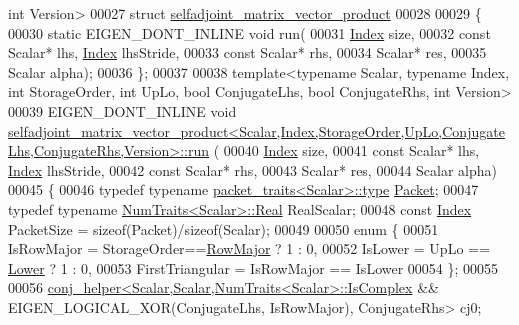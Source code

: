 \begin{DoxyCode}
       \textcolor{keywordtype}{int} Version>
00027 \textcolor{keyword}{struct }\hyperlink{struct_eigen_1_1internal_1_1selfadjoint__matrix__vector__product}{selfadjoint\_matrix\_vector\_product}
00028 
00029 \{
00030 \textcolor{keyword}{static} EIGEN\_DONT\_INLINE \textcolor{keywordtype}{void} run(
00031   \hyperlink{namespace_eigen_a62e77e0933482dafde8fe197d9a2cfde}{Index} size,
00032   \textcolor{keyword}{const} Scalar*  lhs, \hyperlink{namespace_eigen_a62e77e0933482dafde8fe197d9a2cfde}{Index} lhsStride,
00033   \textcolor{keyword}{const} Scalar*  rhs,
00034   Scalar* res,
00035   Scalar alpha);
00036 \};
00037 
00038 \textcolor{keyword}{template}<\textcolor{keyword}{typename} Scalar, \textcolor{keyword}{typename} Index, \textcolor{keywordtype}{int} StorageOrder, \textcolor{keywordtype}{int} UpLo, \textcolor{keywordtype}{bool} ConjugateLhs, \textcolor{keywordtype}{bool} ConjugateRhs,
       \textcolor{keywordtype}{int} Version>
00039 EIGEN\_DONT\_INLINE \textcolor{keywordtype}{void} 
      \hyperlink{struct_eigen_1_1internal_1_1selfadjoint__matrix__vector__product}{selfadjoint\_matrix\_vector\_product<Scalar,Index,StorageOrder,UpLo,ConjugateLhs,ConjugateRhs,Version>::run}
      (
00040   \hyperlink{namespace_eigen_a62e77e0933482dafde8fe197d9a2cfde}{Index} size,
00041   \textcolor{keyword}{const} Scalar*  lhs, \hyperlink{namespace_eigen_a62e77e0933482dafde8fe197d9a2cfde}{Index} lhsStride,
00042   \textcolor{keyword}{const} Scalar*  rhs,
00043   Scalar* res,
00044   Scalar alpha)
00045 \{
00046   \textcolor{keyword}{typedef} \textcolor{keyword}{typename} \hyperlink{struct_eigen_1_1internal_1_1packet__traits}{packet\_traits<Scalar>::type} \hyperlink{union_eigen_1_1internal_1_1_packet}{Packet};
00047   \textcolor{keyword}{typedef} \textcolor{keyword}{typename} \hyperlink{group___core___module_struct_eigen_1_1_num_traits}{NumTraits<Scalar>::Real} RealScalar;
00048   \textcolor{keyword}{const} \hyperlink{namespace_eigen_a62e77e0933482dafde8fe197d9a2cfde}{Index} PacketSize = \textcolor{keyword}{sizeof}(Packet)/\textcolor{keyword}{sizeof}(Scalar);
00049 
00050   \textcolor{keyword}{enum} \{
00051     IsRowMajor = StorageOrder==\hyperlink{group__enums_ggaacded1a18ae58b0f554751f6cdf9eb13acfcde9cd8677c5f7caf6bd603666aae3}{RowMajor} ? 1 : 0,
00052     IsLower = UpLo == \hyperlink{group__enums_gga39e3366ff5554d731e7dc8bb642f83cda891792b8ed394f7607ab16dd716f60e6}{Lower} ? 1 : 0,
00053     FirstTriangular = IsRowMajor == IsLower
00054   \};
00055 
00056   \hyperlink{struct_eigen_1_1internal_1_1conj__helper}{conj\_helper<Scalar,Scalar,NumTraits<Scalar>::IsComplex}
       && EIGEN\_LOGICAL\_XOR(ConjugateLhs,  IsRowMajor), ConjugateRhs> cj0;

\end{DoxyCode}
